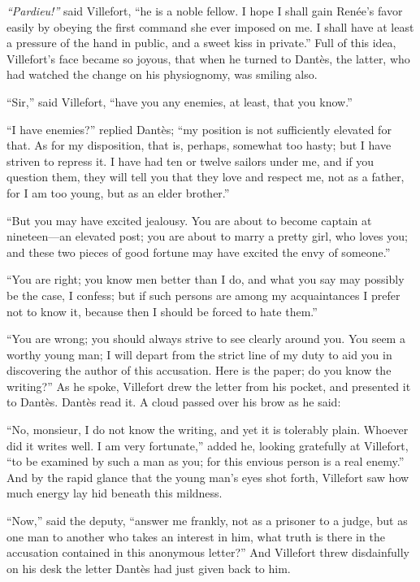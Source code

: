 \textit{“Pardieu!”} said Villefort, “he is a noble fellow. I hope I shall gain
Renée’s favor easily by obeying the first command she ever imposed on
me. I shall have at least a pressure of the hand in public, and a sweet
kiss in private.” Full of this idea, Villefort’s face became so joyous,
that when he turned to Dantès, the latter, who had watched the change
on his physiognomy, was smiling also.

“Sir,” said Villefort, “have you any enemies, at least, that you know.”

“I have enemies?” replied Dantès; “my position is not sufficiently
elevated for that. As for my disposition, that is, perhaps, somewhat
too hasty; but I have striven to repress it. I have had ten or twelve
sailors under me, and if you question them, they will tell you that
they love and respect me, not as a father, for I am too young, but as
an elder brother.”

“But you may have excited jealousy. You are about to become captain at
nineteen—an elevated post; you are about to marry a pretty girl, who
loves you; and these two pieces of good fortune may have excited the
envy of someone.”

“You are right; you know men better than I do, and what you say may
possibly be the case, I confess; but if such persons are among my
acquaintances I prefer not to know it, because then I should be forced
to hate them.”

“You are wrong; you should always strive to see clearly around you. You
seem a worthy young man; I will depart from the strict line of my duty
to aid you in discovering the author of this accusation. Here is the
paper; do you know the writing?” As he spoke, Villefort drew the letter
from his pocket, and presented it to Dantès. Dantès read it. A cloud
passed over his brow as he said:

“No, monsieur, I do not know the writing, and yet it is tolerably
plain. Whoever did it writes well. I am very fortunate,” added he,
looking gratefully at Villefort, “to be examined by such a man as you;
for this envious person is a real enemy.” And by the rapid glance that
the young man’s eyes shot forth, Villefort saw how much energy lay hid
beneath this mildness.

“Now,” said the deputy, “answer me frankly, not as a prisoner to a
judge, but as one man to another who takes an interest in him, what
truth is there in the accusation contained in this anonymous letter?”
And Villefort threw disdainfully on his desk the letter Dantès had just
given back to him.

